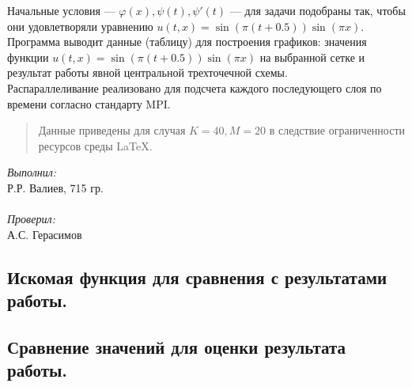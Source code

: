 \documentclass[12pt, a4paper, final]{article}
\begin{document}
Начальные условия --- $ \varphi(x), \psi(t), \psi'(t) $ --- для задачи подобраны так, чтобы они удовлетворяли уравнению $ u(t, x) = \sin(\pi (t + 0.5)) \sin(\pi x) $.\\

Программа выводит данные (таблицу) для построения графиков: значения функции $ u(t, x) = \sin(\pi (t + 0.5)) \sin(\pi x) $ на выбранной сетке и результат работы явной центральной трехточечной схемы.\\

Распараллеливание реализовано для подсчета каждого последующего слоя по времени согласно стандарту MPI.

\begin{quote}
Данные приведены для случая $ K = 40, M = 20 $ в следствие ограниченности ресурсов среды \LaTeX.
\end{quote}

\vfill

\begin{minipage}[b]{0.33\textwidth}
    \textit{Выполнил:}\\
    Р.Р. Валиев, 715 гр.\\\\
    \textit{Проверил:}\\
    А.С. Герасимов
\end{minipage}

\newpage

{\centering \subsection*{Искомая функция для сравнения с результатами работы.}}

\begin{center}
\end{center}

{\centering \subsection*{Сравнение значений для оценки результата работы.}}

\end{document}
